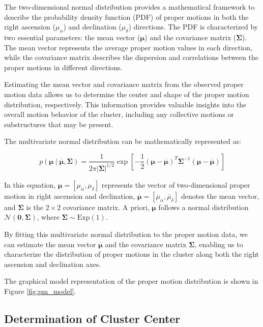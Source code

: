 \documentclass[fleqn,usenatbib,usedcolumn,useAMS]{mnras}
\begin{document}
The two-dimensional normal distribution provides a mathematical framework to describe the probability density function (PDF) of proper motions in both the right ascension ($\mu_{\alpha}$) and declination ($\mu_{\delta}$) directions. The PDF is characterized by two essential parameters: the mean vector ($\boldsymbol{\mu}$) and the covariance matrix ($\boldsymbol{\Sigma}$). The mean vector represents the average proper motion values in each direction, while the covariance matrix describes the dispersion and correlations between the proper motions in different directions.

Estimating the mean vector and covariance matrix from the observed proper motion data allows us to determine the center and shape of the proper motion distribution, respectively. This information provides valuable insights into the overall motion behavior of the cluster, including any collective motions or substructures that may be present.

The multivariate normal distribution can be mathematically represented as:

\begin{equation}
p(\mathbf{\mu} \mid \boldsymbol{\overline{\mu}}, \boldsymbol{\Sigma}) = \frac{1}{2\pi |\boldsymbol{\Sigma}|^{1/2}} \exp{\left[-\frac{1}{2} (\mathbf{\mu} - \boldsymbol{\overline{\mu}})^T \boldsymbol{\Sigma}^{-1} (\mathbf{\mu} - \boldsymbol{\overline{\mu}})\right]}
\end{equation}

In this equation, $\mathbf{\mu} = [\mu_\alpha, \mu_\delta]$ represents the vector of two-dimensional proper motion in right ascension and declination, $\boldsymbol{\overline{\mu}} = [\overline{\mu}_\alpha, \overline{\mu}_\delta]$ denotes the mean vector, and $\boldsymbol{\Sigma}$ is the $2 \times 2$ covariance matrix. A priori, $\boldsymbol{\mu}$ follows a normal distribution $\mathcal{N}(\boldsymbol{0}, \boldsymbol{\Sigma})$, where $\boldsymbol{\Sigma} \sim \textrm{Exp}(1)$.

By fitting this multivariate normal distribution to the proper motion data, we can estimate the mean vector $\boldsymbol{\overline{\mu}}$ and the covariance matrix $\boldsymbol{\Sigma}$, enabling us to characterize the distribution of proper motions in the cluster along both the right ascension and declination axes.

The graphical model representation of the proper motion distribution is shown in Figure \ref{fig:pm_model}.


\subsection{Determination of Cluster Center}
\end{document}
